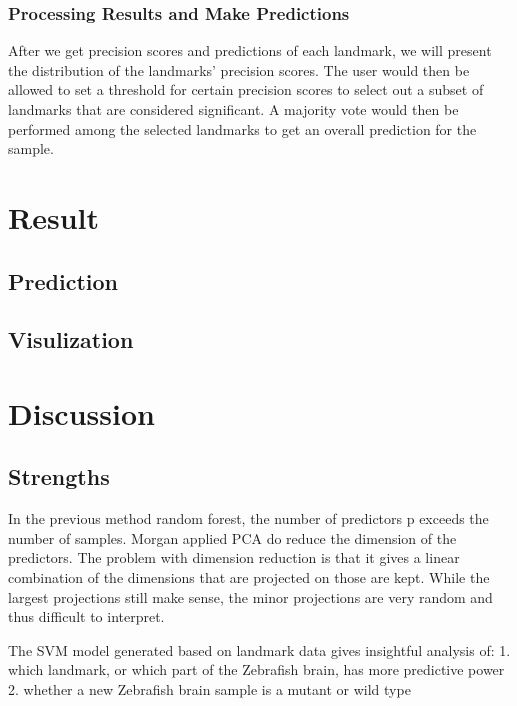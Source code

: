 \documentclass[10pt,letterpaper]{article}
\begin{document}
\subsubsection{Processing Results and Make
Predictions}\label{processing-results-and-make-predictions}

After we get precision scores and predictions of each landmark, we will
present the distribution of the landmarks' precision scores. The user
would then be allowed to set a threshold for certain precision scores to
select out a subset of landmarks that are considered significant. A
majority vote would then be performed among the selected landmarks to
get an overall prediction for the sample.

\section{Result}\label{result}

\subsection{Prediction}\label{prediction}

\subsection{Visulization}\label{visulization}

\section{Discussion}\label{discussion}

\subsection{Strengths}\label{strengths}

In the previous method random forest, the number of predictors p exceeds
the number of samples. Morgan applied PCA do reduce the dimension of the
predictors. The problem with dimension reduction is that it gives a
linear combination of the dimensions that are projected on those are
kept. While the largest projections still make sense, the minor
projections are very random and thus difficult to interpret.

The SVM model generated based on landmark data gives insightful analysis
of: 1. which landmark, or which part of the Zebrafish brain, has more
predictive power 2. whether a new Zebrafish brain sample is a mutant or
wild type
\end{document}
